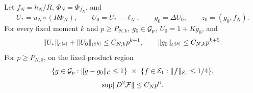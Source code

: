 \begin{proposition}
\label{inf:centre-source-norm}
Let $f_N=h_N/R$, $\Phi_N=\Phi_{f_N}$, and
\begin{equation}\label{inf:clamped-centre}
 U_*=u_N\circ(R\Phi_N),\qquad U_0=U_*-\ell_N,
 \qquad g_0=\Delta U_0,\qquad z_0=(g_0,f_N).
\end{equation}
For every fixed moment $k$ and $p\ge P_{N,k}$,
$g_0\in\mathcal{G}_p$, $U_0=1+Kg_0$, and
\begin{equation}\label{inf:centre-norm-bounds}
 \lVert U_*\rVert_{\mathcal C^{[k]}}+\lVert U_0\rVert_{\mathcal C^{[k]}}
 \le C_{N,k}p^{k+1},\qquad
 \lVert g_0\rVert_{\mathcal C^{[k]}}\le C_{N,k}p^{k+5}.
\end{equation}
For $p\ge P_{N,0}$, on the fixed product region
\begin{equation}\label{inf:nonlinear-working-region}
 \{g\in\mathcal{G}_p:\lVert g-g_0\rVert_{\mathcal C}\le1\}
 \ \times\ \{f\in\mathcal E_1:\lVert f\rVert_{\mathcal E_1}\le1/4\},
\end{equation}
\begin{equation}\label{inf:p6-second}
 \sup\lVert D^2\mathcal F\rVert\le C_Np^6.
\end{equation}
\end{proposition}
